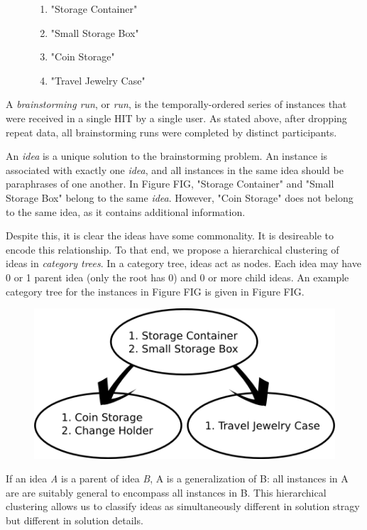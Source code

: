 \begin{figure}[!h]
    \begin{enumerate}
        \item "Storage Container"
        \item "Small Storage Box"
        \item "Coin Storage"
        \item "Travel Jewelry Case"
    \end{enumerate}
    \label{sample_instances}
\end{figure}

A \emph{brainstorming run}, or \emph{run}, is the temporally-ordered series of instances that were received in a single HIT by a single user. As stated above, after dropping repeat data, all brainstorming runs were completed by distinct participants.

An \emph{idea} is a unique solution to the brainstorming problem. An instance is associated with exactly one \emph{idea}, and all instances in the same idea should be paraphrases of one another. In Figure FIG, "Storage Container" and "Small Storage Box" belong to the same \emph{idea}. However, "Coin Storage" does not belong to the same idea, as it contains additional information.

Despite this, it is clear the ideas have some commonality. It is desireable to encode this relationship. To that end, we propose a hierarchical clustering of ideas in \emph{category trees}. In a category tree, ideas act as nodes. Each idea may have 0 or 1 parent idea (only the root has 0) and 0 or more child ideas. An example category tree for the instances in Figure FIG is given in Figure FIG.

\begin{figure}[!h]
    \centering
    \includegraphics[width=0.9\columnwidth]{example_instances}
\end{figure}

If an idea \emph{A} is a parent of idea \emph{B}, A is a generalization of B: all instances in A are are suitably general to encompass all instances in B. This hierarchical clustering allows us to classify ideas as simultaneously different in solution stragy but different in solution details.

